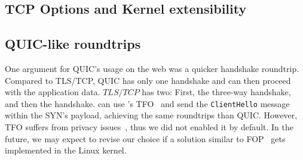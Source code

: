 \subsection{TCP Options and Kernel extensibility}

\subsection{QUIC-like roundtrips}

One argument for QUIC's usage on the web was a quicker handshake roundtrip.
Compared to TLS/TCP, QUIC has only one handshake and can then proceed with the
application data. $TLS/TCP$ has two: First, the \tcp three-way handshake, and
then the \tls handshake. \tcpls can use \tcp's TFO~\cite{radhakrishnan2011tcp}
and send the \texttt{ClientHello} message within the \tcp SYN's payload,
achieving the same roundtrips than QUIC. However, TFO suffers from privacy
issues~\cite{sy2020enhanced}, thus we did not enabled it by default. In the
future, we may expect to revise our choice if a solution similar to \tcp
FOP~\cite{sy2020enhanced} gets implemented in the Linux kernel.


